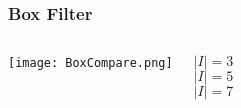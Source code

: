 \documentclass{beamer}
\begin{document}

\begin{frame}
\begin{center}
\frametitle{Box Filter}

\begin{columns}


\texttt{[image: BoxCompare.png]}


\justifying

$\lvert I \rvert = 3$\\

$ $\\

$ $\\

$ $\\

$ $\\

$\lvert I \rvert = 5$\\

$ $\\

$ $\\

$ $\\

$ $\\

$\lvert I \rvert = 7$

\end{columns}

\end{center}
\end{frame}

\end{document}
